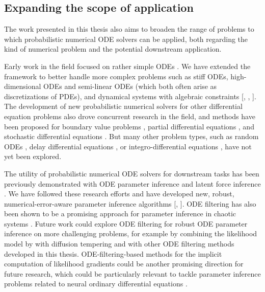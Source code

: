 \documentclass{mimosis}
\begin{document}
\subsection{Expanding the scope of application}
\label{sec:org083fcf4}
The work presented in this thesis also aims to broaden the range of problems to which probabilistic numerical ODE solvers can be applied, both regarding the kind of numerical problem and the potential downstream application.

Early work in the field focused on rather simple ODEs
\parencite{schober16_probab_model_numer_solut_initial_value_probl,kersting18_conver_rates_gauss_ode_filter,tronarp18_probab_solut_to_ordin_differ,tronarp20_bayes_ode_solver}.
We have extended the framework to better handle more complex problems such as stiff ODEs, high-dimensional ODEs and semi-linear ODEs (which both often arise as discretizations of PDEs), and dynamical systems with algebraic constraints
{[}\spickandmix{}, \sprobexpint{}, \shighdim{}].
The development of new probabilistic numerical solvers for other differential equation problems also drove concurrent research in the field, and methods have been proposed for
boundary value problems \parencite{kraemer202bvp},
partial differential equations \parencite{pmlr-v151-kramer22a},
and stochastic differential equations \parencite{fay2023}.
But many other problem types, such as
random ODEs \parencite{RODEbook2017},
delay differential equations \parencite{kuang1993delay},
or integro-differential equations \parencite{lakshmikantham1995theory},
have not yet been explored.

The utility of probabilistic numerical ODE solvers for downstream tasks has been previously demonstrated with ODE parameter inference
\parencite{kersting20_differ_likel_fast_inver_free_dynam_system}
and latent force inference
\parencite{schmidt21_probab_state_space_model_joint}.
We have followed these research efforts and have developed new, robust, numerical-error-aware parameter inference algorithms
{[}\sfenrir{}, \stempering{}].
ODE filtering has also been shown to be a promising approach for parameter inference in chaotic systems \parencite{dalton2024}.
Future work could explore ODE filtering for robust ODE parameter inference on more challenging problems, for example by combining the likelihood model by \textcite{dalton2024} with diffusion tempering and with other ODE filtering methods developed in this thesis.
ODE-filtering-based methods for the implicit computation of likelihood gradients could be another promising direction for future research, which could be particularly relevant to tackle parameter inference problems related to neural ordinary differential equations
\parencite{chen18_neural_ordin_differ_equat}.
\end{document}
